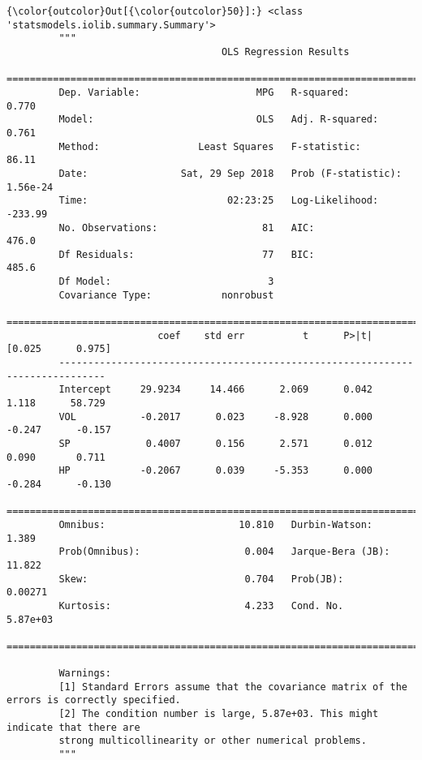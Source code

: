 \documentclass[11pt]{article}
\begin{document}
\begin{Verbatim}[commandchars=\\\{\}]
{\color{outcolor}Out[{\color{outcolor}50}]:} <class 'statsmodels.iolib.summary.Summary'>
         """
                                     OLS Regression Results                            
         ==============================================================================
         Dep. Variable:                    MPG   R-squared:                       0.770
         Model:                            OLS   Adj. R-squared:                  0.761
         Method:                 Least Squares   F-statistic:                     86.11
         Date:                Sat, 29 Sep 2018   Prob (F-statistic):           1.56e-24
         Time:                        02:23:25   Log-Likelihood:                -233.99
         No. Observations:                  81   AIC:                             476.0
         Df Residuals:                      77   BIC:                             485.6
         Df Model:                           3                                         
         Covariance Type:            nonrobust                                         
         ==============================================================================
                          coef    std err          t      P>|t|      [0.025      0.975]
         ------------------------------------------------------------------------------
         Intercept     29.9234     14.466      2.069      0.042       1.118      58.729
         VOL           -0.2017      0.023     -8.928      0.000      -0.247      -0.157
         SP             0.4007      0.156      2.571      0.012       0.090       0.711
         HP            -0.2067      0.039     -5.353      0.000      -0.284      -0.130
         ==============================================================================
         Omnibus:                       10.810   Durbin-Watson:                   1.389
         Prob(Omnibus):                  0.004   Jarque-Bera (JB):               11.822
         Skew:                           0.704   Prob(JB):                      0.00271
         Kurtosis:                       4.233   Cond. No.                     5.87e+03
         ==============================================================================
         
         Warnings:
         [1] Standard Errors assume that the covariance matrix of the errors is correctly specified.
         [2] The condition number is large, 5.87e+03. This might indicate that there are
         strong multicollinearity or other numerical problems.
         """
\end{Verbatim}
            
\end{document}
